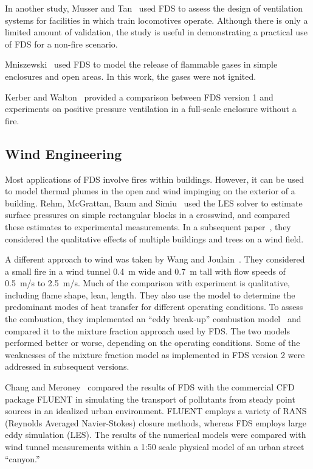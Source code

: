 In another  study, Musser and  Tan~\cite{Musser:2} used FDS  to assess the  design  of ventilation  systems  for  facilities  in which  train locomotives  operate.  Although there  is  only  a  limited amount  of validation, the  study is useful  in demonstrating a practical  use of FDS for a non-fire scenario.

Mniszewski~\cite{Mniszewski:1}  used  FDS  to  model  the  release  of flammable gases in simple enclosures and open areas. In this work, the gases were not ignited.

Kerber  and Walton~\cite{Kerber:1}  provided a  comparison between  FDS version  1 and experiments on positive pressure ventilation in a full-scale enclosure without a fire.   


\subsection{Wind Engineering}

Most applications  of FDS involve fires within  buildings. However, it can be used to model thermal  plumes in the open and wind impinging on the
exterior   of   a   building.    Rehm,   McGrattan,   Baum   and Simiu~\cite{LES:4} used the LES solver to estimate surface pressures on simple
rectangular blocks in  a crosswind, and compared these estimates to experimental measurements.  In a subsequent paper~\cite{Rehm:WS02}, they considered
the qualitative  effects of multiple buildings and trees on a wind field.

A   different    approach   to   wind    was   taken   by    Wang   and Joulain~\cite{Wang:IAFSS2002}. They  considered a  small fire in  a wind tunnel
0.4~m wide  and  0.7~m tall  with  flow speeds  of 0.5~m/s  to 2.5~m/s.  Much  of  the  comparison with  experiment  is  qualitative, including
flame shape,  lean,  length.  They also  use  the model  to determine  the  predominant  modes  of  heat  transfer  for  different operating
conditions. To  assess  the combustion,  they implemented  an ``eddy break-up''  combustion model~\cite{Magnussen:1} and  compared it to the mixture
fraction approach used by FDS.  The two models performed better or  worse, depending on  the operating conditions. Some  of the weaknesses of the
mixture fraction model as implemented in FDS version 2 were addressed in subsequent versions.

Chang and Meroney~\cite{ChangJWE2003} compared the results of FDS with the  commercial CFD  package  FLUENT in  simulating  the transport  of
pollutants   from  steady   point  sources   in  an   idealized  urban environment.  FLUENT  employs a  variety  of  RANS (Reynolds  Averaged
Navier-Stokes)  closure  methods,   whereas  FDS  employs  large  eddy simulation (LES).   The results of the numerical  models were compared with
wind tunnel measurements within a 1:50 scale physical model of an urban street ``canyon.''


